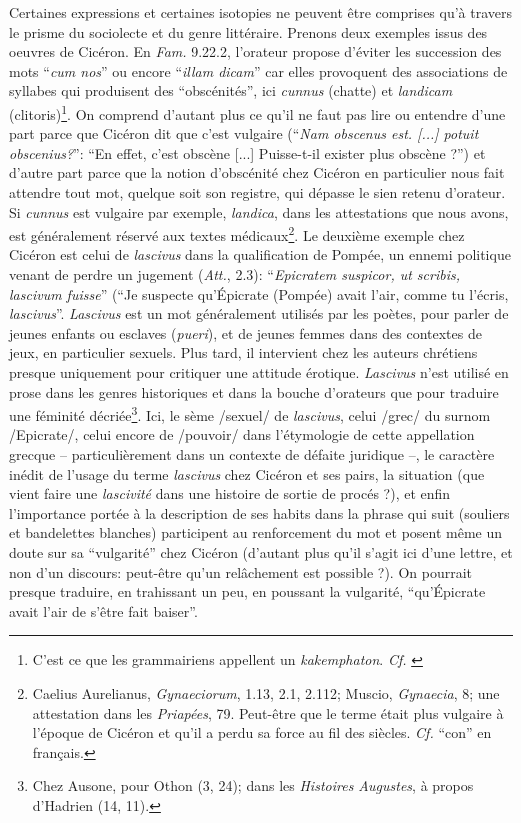 Certaines expressions et certaines isotopies ne peuvent être comprises qu'à travers le prisme du sociolecte et du genre littéraire. Prenons deux exemples issus des oeuvres de Cicéron. En \textit{Fam.} 9.22.2, l'orateur propose d'éviter les succession des mots \enquote{\textit{cum nos}} ou encore \enquote{\textit{illam dicam}} car elles provoquent des associations de syllabes qui produisent des \enquote{obscénités}, ici \textit{cunnus} (chatte) et \textit{landicam} (clitoris)\footnote{C'est ce que les grammairiens appellent un \textit{kakemphaton}. \textit{Cf.} \textcite{nicolas2007gros}}. On comprend d'autant plus ce qu'il ne faut pas lire ou entendre d'une part parce que Cicéron dit que c'est vulgaire (\enquote{\textit{Nam obscenus est. [...] potuit obscenius?}}: \enquote{En effet, c'est obscène [...] Puisse-t-il exister plus obscène ?}) et d'autre part parce que la notion d'obscénité chez Cicéron en particulier nous fait attendre tout mot, quelque soit son registre, qui dépasse le sien retenu d'orateur. Si \textit{cunnus} est vulgaire par exemple, \textit{landica}, dans les attestations que nous avons, est généralement réservé aux textes médicaux\footnote{Caelius Aurelianus, \textit{Gynaeciorum}, 1.13, 2.1, 2.112; Muscio, \textit{Gynaecia}, 8; une attestation dans les \textit{Priapées}, 79. Peut-être que le terme était plus vulgaire à l'époque de Cicéron et qu'il a perdu sa force au fil des siècles. \textit{Cf.} \enquote{con} en français.}. Le deuxième exemple chez Cicéron est celui de \textit{lascivus} dans la qualification de Pompée, un ennemi politique venant de perdre un jugement (\textit{Att.}, 2.3): \enquote{\textit{Epicratem suspicor, ut scribis, lascivum fuisse}} (\enquote{Je suspecte qu'Épicrate (Pompée) avait l'air, comme tu l'écris, \textit{lascivus}}. \textit{Lascivus} est un mot généralement utilisés par les poètes, pour parler de jeunes enfants ou esclaves (\textit{pueri}), et de jeunes femmes dans des contextes de jeux, en particulier sexuels. Plus tard, il intervient chez les auteurs chrétiens presque uniquement pour critiquer une attitude érotique. \textit{Lascivus} n'est utilisé en prose dans les genres historiques et dans la bouche d'orateurs que pour traduire une féminité décriée\footnote{Chez Ausone, pour Othon (3, 24); dans les \textit{Histoires Augustes}, à propos d'Hadrien (14, 11).}. Ici, le sème /sexuel/ de \textit{lascivus}, celui /grec/ du surnom /Epicrate/, celui encore de /pouvoir/ dans l'étymologie de cette appellation grecque -- particulièrement dans un contexte de défaite juridique --, le caractère inédit de l'usage du terme \textit{lascivus} chez Cicéron et ses pairs, la situation (que vient faire une \textit{lascivité} dans une histoire de sortie de procés ?), et enfin l'importance portée à la description de ses habits dans la phrase qui suit (souliers et bandelettes blanches) participent au renforcement du mot et posent même un doute sur sa \enquote{vulgarité} chez Cicéron (d'autant plus qu'il s'agit ici d'une lettre, et non d'un discours: peut-être qu'un relâchement est possible ?). On pourrait presque traduire, en trahissant un peu, en poussant la vulgarité, \enquote{qu'Épicrate avait l'air de s'être fait baiser}.

